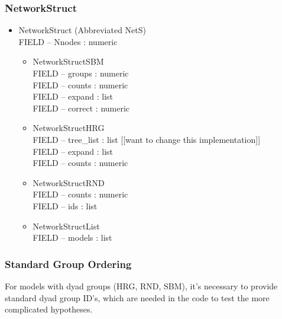 \documentclass[11pt]{article}
\begin{document}
\subsubsection{NetworkStruct}
\begin{itemize}

\item NetworkStruct (Abbreviated NetS)\\
FIELD -- Nnodes : numeric
\begin{itemize}
\item NetworkStructSBM\\
FIELD -- groups : numeric\\
FIELD -- counts : numeric\\
FIELD -- expand : list\\
FIELD -- correct : numeric\\
\item NetworkStructHRG\\
FIELD -- tree\_list : list [[want to change this implementation]] \\
FIELD -- expand : list\\
FIELD -- counts : numeric\\
\item NetworkStructRND\\
FIELD -- counts : numeric\\
FIELD -- ids : list\\
\item NetworkStructList\\
FIELD -- models : list\\
\end{itemize}
\end{itemize}


\subsubsection{Standard Group Ordering}

For models with dyad groups (HRG, RND, SBM), it's necessary to provide standard dyad group ID's, which are needed in the code to test the more complicated hypotheses. \\
\end{document}
